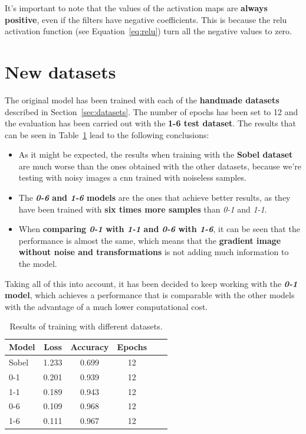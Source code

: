 It's important to note that the values of the activation maps are \textbf{always positive}, even if the filters have negative coefficients. This is because the \gls{relu} activation function (see Equation~\ref{eq:relu}) turn all the negative values to zero.

\section{New datasets}\label{sec:new_datasets}
The original model has been trained with each of the \textbf{handmade datasets} described in Section~\ref{sec:datasets}. The number of epochs has been set to 12 and the evaluation has been carried out with the \textbf{1-6 test dataset}. The results that can be seen in Table~\ref{tbl:datasets} lead to the following conclusions:
\begin{itemize}
	\item As it might be expected, the results when training with the \textbf{Sobel dataset} are much worse than the ones obtained with the other datasets, because we're testing with noisy images a \gls{cnn} trained with noiseless samples.
	\item The \textbf{\textit{0-6} and \textit{1-6} models} are the ones that achieve better results, as they have been trained with \textbf{six times more samples} than \textit{0-1} and \textit{1-1}.
	\item When \textbf{comparing \textit{0-1} with \textit{1-1} and \textit{0-6} with \textit{1-6}}, it can be seen that the performance is almost the same, which means that the \textbf{gradient image without noise and transformations} is not adding much information to the model.
\end{itemize}

Taking all of this into account, it has been decided to keep working with the \textbf{\textit{0-1} model}, which achieves a performance that is comparable with the other models with the advantage of a much lower computational cost.

\begin{table}
	\centering
	\begin{tabular}{l*{4}{c}r}
		\textbf{Model} & \textbf{Loss} & \textbf{Accuracy} & \textbf{Epochs} \\
		\hline
		Sobel & 1.233 & 0.699 & 12 \\
		0-1 & 0.201 & 0.939 & 12 \\
		1-1 & 0.189 & 0.943 & 12 \\
		0-6 & 0.109 & 0.968 & 12 \\
		1-6 & 0.111 & 0.967 & 12 \\
	\end{tabular}
	\caption{Results of training with different datasets.}
	\label{tbl:datasets}
\end{table}

